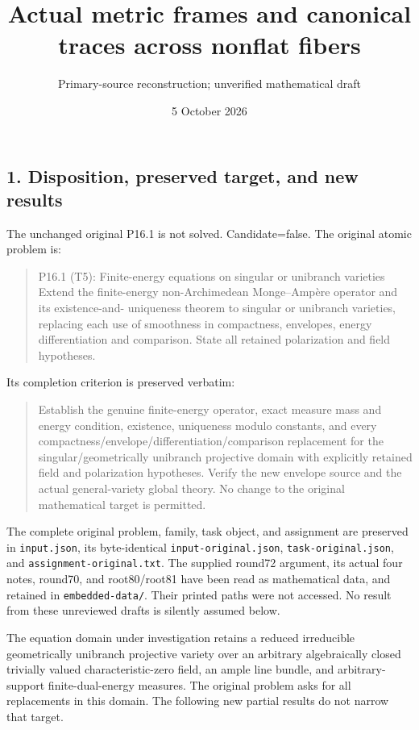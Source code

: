 \documentclass[
  10pt,
]{article}
\title{Actual metric frames and canonical traces across nonflat fibers}
\author{Primary-source reconstruction; unverified mathematical draft}
\date{5 October 2026}
\begin{document}
\maketitle

\subsection{1. Disposition, preserved target, and new
results}\label{disposition-preserved-target-and-new-results}

The unchanged original P16.1 is not solved. Candidate=false. The
original atomic problem is:

\begin{quote}
P16.1 (T5): Finite-energy equations on singular or unibranch varieties
Extend the ﬁnite-energy non-Archimedean Monge--Ampère operator and its
existence-and- uniqueness theorem to singular or unibranch varieties,
replacing each use of smoothness in compactness, envelopes, energy
diﬀerentiation and comparison. State all retained polarization and ﬁeld
hypotheses.
\end{quote}

Its completion criterion is preserved verbatim:

\begin{quote}
Establish the genuine finite-energy operator, exact measure mass and
energy condition, existence, uniqueness modulo constants, and every
compactness/envelope/differentiation/comparison replacement for the
singular/geometrically unibranch projective domain with explicitly
retained field and polarization hypotheses. Verify the new envelope
source and the actual general-variety global theory. No change to the
original mathematical target is permitted.
\end{quote}

The complete original problem, family, task object, and assignment are
preserved in \texttt{input.json}, its byte-identical
\texttt{input-original.json}, \texttt{task-original.json}, and
\texttt{assignment-original.txt}. The supplied round72 argument, its
actual four notes, round70, and root80/root81 have been read as
mathematical data, and retained in \texttt{embedded-data/}. Their
printed paths were not accessed. No result from these unreviewed drafts
is silently assumed below.

The equation domain under investigation retains a reduced irreducible
geometrically unibranch projective variety over an arbitrary
algebraically closed trivially valued characteristic-zero field, an
ample line bundle, and arbitrary-support finite-dual-energy measures.
The original problem asks for all replacements in this domain. The
following new partial results do not narrow that target.
\end{document}
